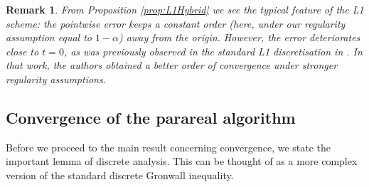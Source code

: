 \documentclass[12pt,a4paper]{article}
\newtheorem{rem}{Remark}
\begin{document}
\begin{rem}
	From Proposition \ref{prop:L1Hybrid} we see the typical feature of the L1 scheme: the pointwise error keeps a constant order (here, under our regularity assumption equal to $1-\alpha$) away from the origin. However, the error deteriorates close to $t = 0$, as was previously observed in the standard L1 discretisation in \cite{stynes2017error}. In that work, the authors obtained a better order of convergence under stronger regularity assumptions. 
\end{rem}

\subsection{Convergence of the parareal algorithm}

Before we proceed to the main result concerning convergence, we state the important lemma of discrete analysis. This can be thought of as a more complex version of the standard discrete Gronwall inequality. 
\end{document}
